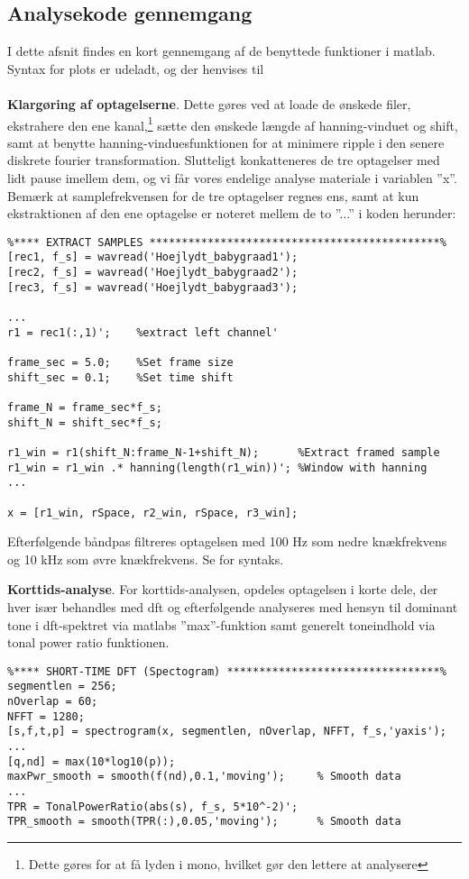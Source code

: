 \subsection*{Analysekode gennemgang}
I dette afsnit findes en kort gennemgang af de benyttede funktioner i matlab. Syntax for plots er udeladt, og der henvises til \citep[SW/Intelligent Lydmonitor/forundersøgelse/il\_forundersoegelse.m]{cd} \\
\\
\textbf{Klargøring af optagelserne}. Dette gøres ved at loade de ønskede filer, ekstrahere den ene kanal,\footnote{Dette gøres for at få lyden i mono, hvilket gør den lettere at analysere} sætte den ønskede længde af hanning-vinduet og shift, samt at benytte hanning-vinduesfunktionen for at minimere ripple i den senere diskrete fourier transformation. Slutteligt konkatteneres de tre optagelser med lidt pause imellem dem, og vi får vores endelige analyse materiale i variablen ''x''. Bemærk at samplefrekvensen for de tre optagelser regnes ens, samt at kun ekstraktionen af den ene optagelse er noteret mellem de to ''...'' i koden herunder:
\begin{verbatim}%**** EXTRACT SAMPLES *********************************************%
[rec1, f_s] = wavread('Hoejlydt_babygraad1');
[rec2, f_s] = wavread('Hoejlydt_babygraad2');
[rec3, f_s] = wavread('Hoejlydt_babygraad3');

...
r1 = rec1(:,1)';    %extract left channel'

frame_sec = 5.0;    %Set frame size
shift_sec = 0.1;    %Set time shift

frame_N = frame_sec*f_s;
shift_N = shift_sec*f_s;

r1_win = r1(shift_N:frame_N-1+shift_N);      %Extract framed sample
r1_win = r1_win .* hanning(length(r1_win))'; %Window with hanning
...

x = [r1_win, rSpace, r2_win, rSpace, r3_win];
\end{verbatim}

Efterfølgende båndpas filtreres optagelsen med 100 Hz som nedre knækfrekvens og 10 kHz som øvre knækfrekvens. Se \citep[SW/Intelligent Lydmonitor/forundersøgelse/il\_forundersoegelse.m]{cd} for syntaks.

\textbf{Korttids-analyse}. For korttids-analysen, opdeles optagelsen i korte dele, der hver især behandles med dft og efterfølgende analyseres med hensyn til dominant tone i dft-spektret via matlabs ''max''-funktion samt generelt toneindhold via tonal power ratio funktionen.
\begin{verbatim}%**** SHORT-TIME DFT (Spectogram) *********************************%
segmentlen = 256;
nOverlap = 60;
NFFT = 1280;
[s,f,t,p] = spectrogram(x, segmentlen, nOverlap, NFFT, f_s,'yaxis'); 
...
[q,nd] = max(10*log10(p)); 
maxPwr_smooth = smooth(f(nd),0.1,'moving');     % Smooth data
...
TPR = TonalPowerRatio(abs(s), f_s, 5*10^-2)';
TPR_smooth = smooth(TPR(:),0.05,'moving');      % Smooth data
\end{verbatim}

